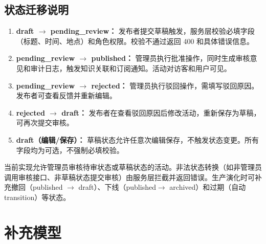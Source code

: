 \documentclass[12pt,a4paper]{ctexart}
\begin{document}
\subsection{状态迁移说明}
\begin{enumerate}
\item \textbf{draft $\rightarrow$ pending\_review：} 发布者提交草稿触发，服务层校验必填字段（标题、时间、地点）和角色权限。校验不通过返回 400 和具体错误信息。
\item \textbf{pending\_review $\rightarrow$ published：} 管理员执行批准操作，同时生成审核意见和审计日志，触发知识关联和订阅通知。活动对访客和用户可见。
\item \textbf{pending\_review $\rightarrow$ rejected：} 管理员执行驳回操作，需填写驳回原因。发布者可查看反馈并重新编辑。
\item \textbf{rejected $\rightarrow$ draft：} 发布者在查看驳回原因后修改活动，重新保存为草稿，可再次提交审核。
\item \textbf{draft（编辑/保存）：} 草稿状态允许任意次编辑保存，不触发状态变更。所有字段均为可选，不强制必填校验。
\end{enumerate}
当前实现允许管理员审核待审状态或草稿状态的活动。非法状态转换（如非管理员调用审核接口、非草稿状态提交审核）由服务层拦截并返回错误。生产演化时可补充撤回（published $\rightarrow$ draft）、下线（published$\rightarrow$ archived）和过期（自动 transition）等状态。

\section{补充模型}
\end{document}

